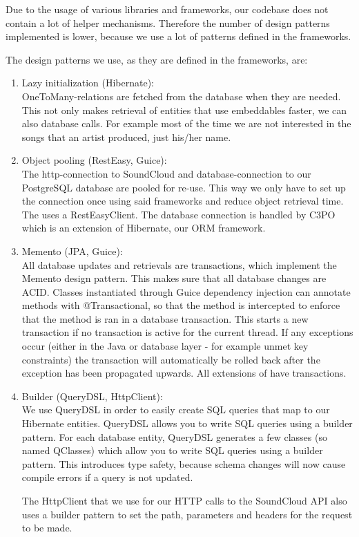 Due to the usage of various libraries and frameworks, our codebase does not contain a lot of helper mechanisms.
Therefore the number of design patterns implemented is lower, because we use a lot of patterns defined in the frameworks.

The design patterns we use, as they are defined in the frameworks, are:

\begin{enumerate}
\item Lazy initialization (Hibernate):\\
OneToMany-relations are fetched from the database when they are needed.
This not only makes retrieval of entities that use embeddables faster, we can also database calls.
For example most of the time we are not interested in the songs that an artist produced, just his/her name.

\item Object pooling (RestEasy, Guice):\\
The http-connection to SoundCloud and database-connection to our PostgreSQL database are pooled for re-use.
This way we only have to set up the connection once using said frameworks and reduce object retrieval time.
The  uses a RestEasyClient.
The database connection is handled by C3PO which is an extension of Hibernate, our \gls{ORM} framework.

\item Memento (JPA, Guice):\\
All database updates and retrievals are transactions, which implement the Memento design pattern.
This makes sure that all database changes are ACID\cite{ACID}.
Classes instantiated through Guice dependency injection can annotate methods with @Transactional, so that the method is intercepted to enforce that the method is ran in a database transaction.
This starts a new transaction if no transaction is active for the current thread.
If any exceptions occur (either in the Java or database layer - for example unmet key constraints) the transaction will automatically be rolled back after the exception has been propagated upwards.
All extensions of  have transactions.

\item Builder (QueryDSL, HttpClient):\\
We use QueryDSL in order to easily create SQL queries that map to our Hibernate entities.
QueryDSL allows you to write SQL queries using a builder pattern.
For each database entity, QueryDSL generates a few classes (so named QClasses) which allow you to write SQL queries using a builder pattern.
This introduces type safety, because schema changes will now cause compile errors if a query is not updated.

The HttpClient that we use for our HTTP calls to the SoundCloud API also uses a builder pattern to set the path, parameters and headers for the request to be made.

\end{enumerate}

